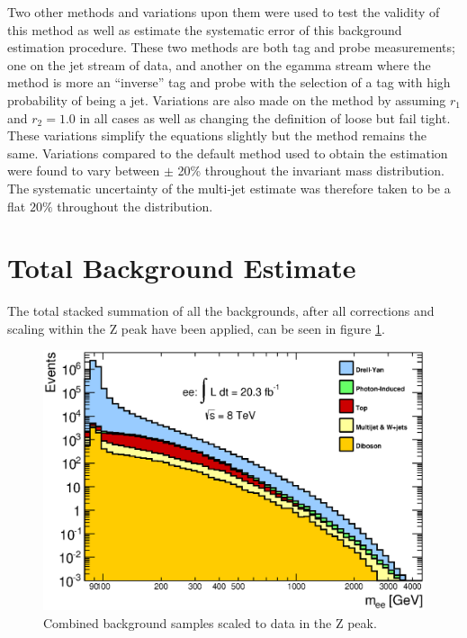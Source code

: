 Two other methods and variations upon them were used to test the validity of this method as well as estimate the systematic error of this background estimation procedure. These two methods are both tag and probe measurements; one on the jet stream of data, and another on the egamma stream where the method is more an ``inverse'' tag and probe with the selection of a tag with high probability of being a jet. Variations are also made on the method by assuming $r_{1}$ and $r_{2} = 1.0$ in all cases as well as changing the definition of loose but fail tight. These variations simplify the equations slightly but the method remains the same. Variations compared to the default method used to obtain the estimation were found to vary between $\pm$ 20\% throughout the invariant mass distribution. The systematic uncertainty of the multi-jet estimate was therefore taken to be a flat $20\%$ throughout the distribution.





\section{Total Background Estimate}

The total stacked summation of all the backgrounds, after all corrections and scaling within the Z peak have been applied, can be seen in figure \ref{fig:totalBKG}.


   \begin{figure}[h]
      \begin{center}
      \includegraphics[width=0.98\linewidth]{images/invMass_bkgonly.eps}
      \end{center}
   \caption{Combined background samples scaled to data in the Z peak.}
   \label{fig:totalBKG}
   \end{figure}






